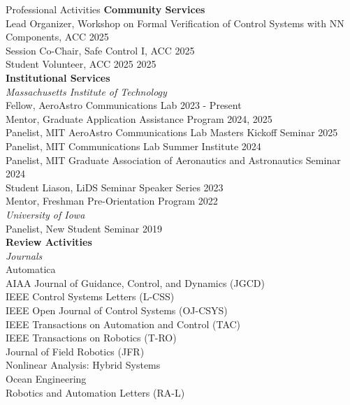 \begin{rSection}{Professional Activities}
    {\bf Community Services}\\
    Lead Organizer,  Workshop on Formal Verification of Control Systems with NN Components, ACC \hfill 2025\\
    Session Co-Chair, Safe Control I, ACC \hfill 2025\\
    Student Volunteer, ACC 2025 \hfill 2025\\


    {\bf Institutional Services}\\
    \textit{Massachusetts Institute of Technology}\\
    Fellow, AeroAstro Communications Lab \hfill 2023 - Present\\
    Mentor, Graduate Application Assistance Program \hfill 2024, 2025\\
    Panelist, MIT AeroAstro Communications Lab Masters Kickoff Seminar \hfill 2025\\
    Panelist, MIT Communications Lab Summer Institute \hfill 2024\\
    Panelist, MIT Graduate Association of Aeronautics and Astronautics Seminar \hfill 2024\\
    Student Liason, LiDS Seminar Speaker Series \hfill 2023\\
    Mentor, Freshman Pre-Orientation Program \hfill 2022\\

    \textit{University of Iowa}\\
    Panelist, New Student Seminar \hfill 2019\\


    {\bf Review Activities}\\
    \textit{Journals}\\
    Automatica\\
    AIAA Journal of Guidance, Control, and Dynamics (JGCD)\\
    IEEE Control Systems Letters (L-CSS)\\
    IEEE Open Journal of Control Systems (OJ-CSYS)\\
    IEEE Transactions on Automation and Control (TAC)\\
    IEEE Transactions on Robotics (T-RO)\\
    Journal of Field Robotics (JFR)\\
    Nonlinear Analysis: Hybrid Systems\\
    Ocean Engineering \\
    Robotics and Automation Letters (RA-L)\\


\end{rSection}
